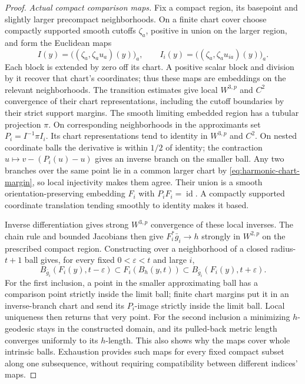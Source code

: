 \documentclass[11pt]{article}
\numberwithin{equation}{section}
\theoremstyle{definition}
\theoremstyle{remark}
\newcommand{\id}{\operatorname{id}}
\begin{document}
\begin{proof}
\emph{Actual compact comparison maps.}
Fix a compact region, its basepoint and slightly larger precompact
neighborhoods. On a finite chart cover choose compactly supported
smooth cutoffs \(\zeta_a\), positive in union on the larger region,
and form the Euclidean maps
\begin{equation}\label{eq:cutoff-coordinate-embedding}
 I(y)=\bigl((\zeta_a,\zeta_a u_a)(y)\bigr)_a,
 \qquad I_i(y)=\bigl((\zeta_a,\zeta_a u_{ia})(y)\bigr)_a.
\end{equation}
Each block is extended by zero off its chart. A positive scalar
block and division by it recover that chart's coordinates;
thus these maps are embeddings on the relevant neighborhoods.
The transition estimates give local \(W^{3,p}\) and \(C^2\)
convergence of their chart representations, including the cutoff
boundaries by their strict support margins. The smooth limiting
embedded region has a tubular projection \(\pi\). On corresponding
neighborhoods in the approximants set \(P_i=I^{-1}\pi I_i\).
Its chart representations tend to identity in \(W^{3,p}\) and
\(C^2\). On nested coordinate balls the derivative is within
\(1/2\) of identity; the contraction
\(u\mapsto v-(P_i(u)-u)\) gives an inverse branch on the smaller ball.
Any two branches over the same point lie in a common larger chart
by \eqref{eq:harmonic-chart-margin}, so local injectivity makes
them agree. Their union is a smooth orientation-preserving
embedding \(F_i\) with \(P_iF_i=\id\). A compactly supported
coordinate translation tending smoothly to identity makes it based.

Inverse differentiation gives strong \(W^{3,p}\) convergence
of these local inverses. The chain rule and bounded Jacobians
then give \(F_i^*\bar g_i\to h\) strongly in \(W^{2,p}\)
on the prescribed compact region. Constructing over a neighborhood
of a closed radius-\(t+1\) ball gives, for every fixed
\(0<\varepsilon<t\) and large \(i\),
\begin{equation}\label{eq:compact-map-ball-coverage}
 B_{\bar g_i}(F_i(y),t-\varepsilon)
       \subset F_i(B_h(y,t))
       \subset B_{\bar g_i}(F_i(y),t+\varepsilon).
\end{equation}
For the first inclusion, a point in the smaller approximating
ball has a comparison point strictly inside the limit ball;
finite chart margins put it in an inverse-branch chart and send
its \(P_i\)-image strictly inside the limit ball. Local uniqueness
then returns that very point. For the second inclusion a minimizing
\(h\)-geodesic stays in the constructed domain, and its pulled-back
metric length converges uniformly to its \(h\)-length. This also
shows why the maps cover whole intrinsic balls. Exhaustion
provides such maps for every fixed compact subset along one
subsequence, without requiring compatibility between different
indices' maps.


\end{proof}
\end{document}
